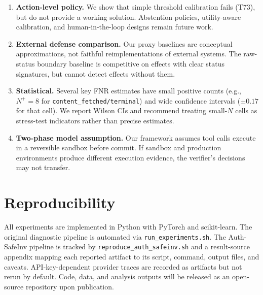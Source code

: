 \documentclass{article}
\begin{document}
\begin{enumerate}
    \item \textbf{Action-level policy.} We show that simple threshold calibration fails (T73), but do not provide a working solution. Abstention policies, utility-aware calibration, and human-in-the-loop designs remain future work.
    \item \textbf{External defense comparison.} Our proxy baselines are conceptual approximations, not faithful reimplementations of external systems. The raw-status boundary baseline is competitive on effects with clear status signatures, but cannot detect effects without them.
    \item \textbf{Statistical.} Several key FNR estimates have small positive counts (e.g., $N^+=8$ for \texttt{content\_fetched/terminal}) and wide confidence intervals ($\pm 0.17$ for that cell). We report Wilson CIs and recommend treating small-$N$ cells as stress-test indicators rather than precise estimates.
    \item \textbf{Two-phase model assumption.} Our framework assumes tool calls execute in a reversible sandbox before commit. If sandbox and production environments produce different execution evidence, the verifier's decisions may not transfer.
\end{enumerate}

\section{Reproducibility}

All experiments are implemented in Python with PyTorch and scikit-learn. The original diagnostic pipeline is automated via \texttt{run\_experiments.sh}. The Auth-SafeInv pipeline is tracked by \texttt{reproduce\_auth\_safeinv.sh} and a result-source appendix mapping each reported artifact to its script, command, output files, and caveats. API-key-dependent provider traces are recorded as artifacts but not rerun by default. Code, data, and analysis outputs will be released as an open-source repository upon publication.
\end{document}
